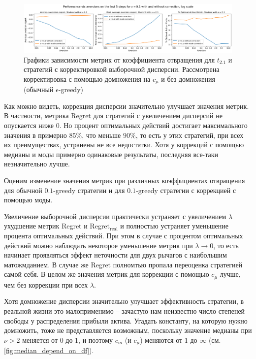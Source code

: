 \begin{figure}[ht!] %
\centering
\includegraphics[width=6in]{theory_tester/theory_images/correction_variance/aversions_last_5_steps.png}
\caption{Графики зависимости метрик от коэффициента отвращения для $t_{2.1}$ и стратегий с корректировкой выборочной дисперсии. Рассмотрена корректировка с помощью домножения на $c_{\mu}$ и без домножения (обычный $\epsilon$-greedy)}
\label{fig:aversion_correction_last_5_steps}
\end{figure}

Как можно видеть, коррекция дисперсии значительно улучшает значения метрик. В частности, метрика Regret для стратегий с увеличением дисперсий не опускается ниже 0. Но процент оптимальных действий достигает максимального значения в примерно $85\%$, что меньше $90\%$, то есть у этих стратегий, при всех их преимуществах, устранены не все недостатки. Хотя у коррекций с помощью медианы и моды примерно одинаковые результаты, последняя все-таки незначительно лучше.

Оценим изменение значения метрик при различных коэффициентах отвращения для обычной $0.1$-greedy стратегии и для $0.1$-greedy стратегии с коррекцией с помощью моды.

Увеличение выборочной дисперсии практически устраняет с увеличением $\lambda$ ухудшение метрик Regret и Regret$_{\text{real}}$ и полностью устраняет уменьшение процента оптимальных действий. При этом в случае с процентом оптимальных действий можно наблюдать некоторое уменьшение метрик при $\lambda \to 0$, то есть начинает проявляться эффект неточности для двух рычагов с наибольшим матожмданием. В случае же Regret полномтью пропала переоценка стратегией самой себя. В целом же значения метрик для коррекции с помощью $c_{\mu}$ лучше, чем без коррекции при всех $\lambda$.

Хотя домножение дисперсии значительно улучшает эффективность стратегии, в реальной жизни это малоприменимо -- зачастую нам неизвестно число степеней свободы у распределения прибыли актива. Угадать константу, на которую нужно домножить, тоже не представляется возможным, поскольку значение медианы при $\nu > 2$ меняется от 0 до 1, и поэтому $c_m$ (и $c_{\mu}$) меняются от 1 до $\infty$ (см. \ref{fig:median_depend_on_df}).

